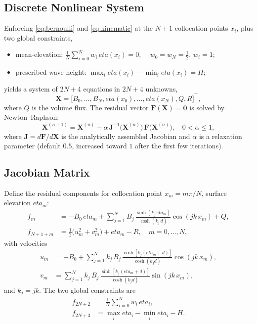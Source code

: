 \documentclass[journal,10pt,twocolumn]{IEEEtran}
\def\eta{eta}%
\def\partial{d}%
\def\;{ }%
\newcommand{\half}{\tfrac{1}{2}}
\begin{document}
\subsection{Discrete Nonlinear System}

Enforcing \eqref{eq:bernoulli} and \eqref{eq:kinematic} at the $N+1$
collocation points $x_i$, plus two global constraints,
\begin{itemize}[leftmargin=1.4em]
    \item mean-elevation:
          $\displaystyle\frac{1}{N}\sum_{i=0}^N w_i\,\eta(x_i)=0$,
          $\quad w_0=w_N=\tfrac{1}{2}$, $w_i=1$;
    \item prescribed wave height:
          $\max_i\eta(x_i)-\min_i\eta(x_i)=H$;
\end{itemize}
yields a system of $2N+4$ equations in $2N+4$ unknowns,
\begin{equation}
    \mathbf{X} =
    \bigl[B_0,\dots,B_N,\;
    \eta(x_0),\dots,\eta(x_N),\;Q,\;R\bigr]^\top,
\end{equation}
where $Q$ is the volume flux.
The residual vector $\mathbf{F}(\mathbf{X}) = \mathbf{0}$ is solved by
Newton--Raphson:
\begin{equation}
    \mathbf{X}^{(n+1)}
    = \mathbf{X}^{(n)}
    - \alpha\,
    \mathbf{J}^{-1}\!\bigl(\mathbf{X}^{(n)}\bigr)\,
    \mathbf{F}\bigl(\mathbf{X}^{(n)}\bigr),
    \quad 0 < \alpha \le 1,
    \label{eq:NR}
\end{equation}
where $\mathbf{J} = \partial\mathbf{F}/\partial\mathbf{X}$ is the
analytically assembled Jacobian and $\alpha$ is a relaxation parameter
(default $0.5$, increased toward $1$ after the first few iterations).

\subsection{Jacobian Matrix}
\label{sec:jacobian}

Define the residual components for collocation point
$x_m = m\pi/N$, surface elevation $\eta_m$:
\begin{align}
    f_m        &= -B_0\,\eta_m
    + \sum_{j=1}^{N} B_j\,
    \frac{\sinh(k_j\,\eta_m)}{\cosh(k_j\,d)}
    \cos(jk\,x_m) + Q,
    \label{eq:fm}\\
    f_{N+1+m}  &= \half\bigl(u_m^2+v_m^2\bigr)
    + \eta_m - R,
    \quad m=0,\dots,N,
    \label{eq:fNm}
\end{align}
with velocities
\begin{align}
    u_m &= {-B_0}
    + \sum_{j=1}^{N} k_j\,B_j\,
    \frac{\cosh[k_j(\eta_m+d)]}{\cosh(k_j d)}
    \cos(jk\,x_m),\\
    v_m &= \sum_{j=1}^{N} k_j\,B_j\,
    \frac{\sinh[k_j(\eta_m+d)]}{\cosh(k_j d)}
    \sin(jk\,x_m),
\end{align}
and $k_j = jk$.
The two global constraints are
\begin{align}
    f_{2N+2} &= \frac{1}{N}\sum_{i=0}^{N} w_i\,\eta_i,\\
    f_{2N+3} &= \max_i\eta_i - \min_i\eta_i - H.
\end{align}
\end{document}
